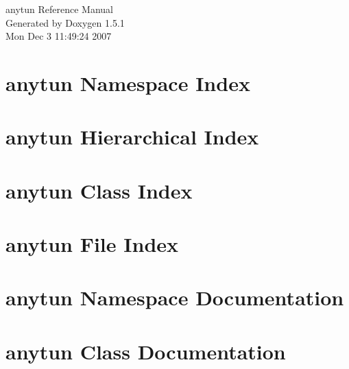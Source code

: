 \documentclass[a4paper]{book}
\begin{document}
\begin{titlepage}
\vspace*{7cm}
\begin{center}
{\Large anytun Reference Manual}\\
\vspace*{1cm}
{\large Generated by Doxygen 1.5.1}\\
\vspace*{0.5cm}
{\small Mon Dec 3 11:49:24 2007}\\
\end{center}
\end{titlepage}
\clearemptydoublepage
{}
\tableofcontents
\clearemptydoublepage
{}
\chapter{anytun Namespace Index}

\chapter{anytun Hierarchical Index}

\chapter{anytun Class Index}

\chapter{anytun File Index}

\chapter{anytun Namespace Documentation}




\chapter{anytun Class Documentation}











































\end{document}

